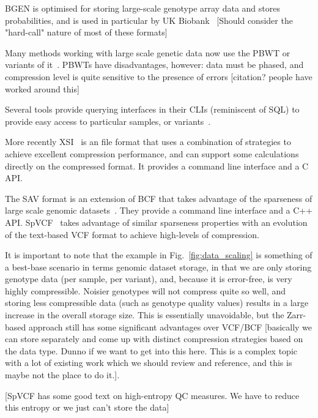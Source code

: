 \documentclass[9pt,lineno]{elife}
\begin{document}
BGEN \citep{band2018bgen} is optimised for storing large-scale
genotype array data and stores probabilities, and is used
in particular by UK Biobank~\citep{bycroft2018genome}
[Should consider the "hard-call" nature of most of these formats]

Many methods working with large scale genetic
data now use the PBWT or variants of
it~\citep[e.g.][]{li2016bgt,lefaive2021sparse,wertenbroek2022xsi}. PBWTs have
disadvantages, however: data must be phased, and compression level
is quite sensitive to the presence of errors [citation? people have
worked around this]


Several tools provide querying interfaces in their CLIs
(reminiscent of SQL) to provide easy access to particular samples, or
variants~\cite{li2016bgt,layer2016efficient}.

More recently XSI~\citep{wertenbroek2022xsi} is an file format that
uses a combination of strategies to achieve excellent compression
performance, and can support some calculations directly on the
compressed format. It provides a command line interface and a
C API.

The SAV format is an extension of BCF that takes advantage
of the sparseness of large scale genomic datasets~\citep{lefaive2021sparse}.
They provide a command line interface and a C++ API.
SpVCF~\citep{lin2020sparse} takes advantage of similar sparseness
properties with an evolution of the text-based VCF format to
achieve high-levels of compression.

\citep{deorowicz2013genome,deorowicz2019gtshark}

\citep{tatwawadi2016gtrac}

It is important to note that the example in Fig.~\ref{fig:data_scaling}
is something of a best-base
scenario in terms genomic dataset storage, in that we are only
storing genotype data (per sample, per variant),
and, because it is error-free, is very
highly compressible. Noisier genotypes will not compress quite
so well, and storing less compressible data (such as genotype
quality values) results in a large increase in the overall
storage size. This is essentially unavoidable, but the Zarr-based
approach still has some significant advantages over VCF/BCF
[basically we can store separately and come up with distinct
compression strategies based on the data type. Dunno if we
want to get into this here. This is a complex topic with
a lot of existing work which we should review and reference,
and this is maybe not the place to do it.].

[SpVCF has some good text on high-entropy QC measures. We have to
reduce this entropy or we just can't store the data]
\end{document}
